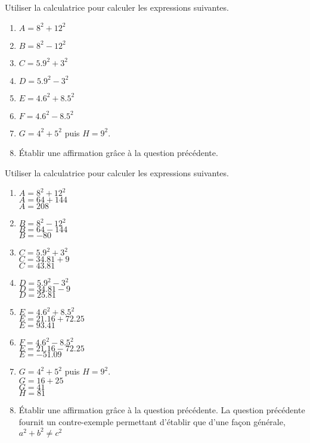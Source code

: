 \begin{exercice*}
    Utiliser la calculatrice pour calculer les expressions suivantes.
    \begin{enumerate}
        \item $A=8^2+12^2$
        \item $B=8^2-12^2$
        \item $C=\num{5.9}^2+3^2$
        \item $D=\num{5.9}^2-3^2$
        \item $E=\num{4.6}^2+\num{8.5}^2$
        \item $F=\num{4.6}^2-\num{8.5}^2$
        \item $G=4^2+5^2$ puis $H=9^2$.
        \item Établir une affirmation grâce à la question précédente.
    \end{enumerate}
\end{exercice*}
\begin{corrige}
    Utiliser la calculatrice pour calculer les expressions suivantes.

    \begin{enumerate}
        \item $A=8^2+12^2$\\{\red $A=64+144$\\$A=208$}        
        \item $B=8^2-12^2$\\{\red $B=64-144$\\$B=-80$}
        \item $C=\num{5.9}^2+3^2$\\{\red $C=\num{34.81}+9$\\$C=\num{43.81}$}
        \item $D=\num{5.9}^2-3^2$\\{\red $D=\num{34.81}-9$\\$D=\num{25.81}$}
        \item $E=\num{4.6}^2+\num{8.5}^2$\\{\red $E=\num{21.16}+\num{72.25}$\\$E=\num{93.41}$}
        \item $F=\num{4.6}^2-\num{8.5}^2$\\{\red $E=\num{21.16}-\num{72.25}$\\$E=\num{-51.09}$}
        \item $G=4^2+5^2$ puis $H=9^2$.\\
        {\red 
            $G=16+25$\\$G=41$\\$H=81$
        }        
        \item Établir une affirmation grâce à la question précédente.
        {\red La question précédente fournit un contre-exemple permettant d'établir que d'une façon générale, $a^2+b^2\neq c^2$}
    \end{enumerate}
\end{corrige}

